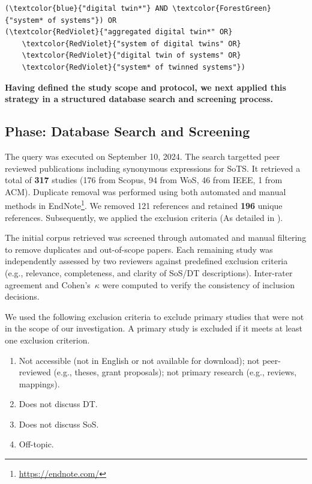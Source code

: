 \begin{footnotesize}
\begin{Verbatim}[commandchars=\\\{\}]
(\textcolor{blue}{"digital twin*"} AND \textcolor{ForestGreen}{"system* of systems"}) OR
(\textcolor{RedViolet}{"aggregated digital twin*" OR}
    \textcolor{RedViolet}{"system of digital twins" OR}
    \textcolor{RedViolet}{"digital twin of systems" OR}
    \textcolor{RedViolet}{"system* of twinned systems"})
\end{Verbatim}
\end{footnotesize}

\textbf{Having defined the study scope and protocol, we next applied this strategy in a structured database search and screening process.}


\subsection{Phase: Database Search and Screening}\label{subsec:literature-review-study-phases-screening}

The query was executed on September 10, 2024. The search targetted peer reviewed publications including synonymous expressions for SoTS. It retrieved a total of \textbf{317} studies (176 from Scopus, 94 from WoS, 46 from IEEE, 1 from ACM). Duplicate removal was performed using both automated and manual methods in EndNote\footnote{\url{https://endnote.com/}}. We removed 121 references and retained \textbf{196} unique references. Subsequently, we applied the exclusion criteria (As detailed in ).

The initial corpus retrieved was screened through automated and manual filtering to remove duplicates and out-of-scope papers. Each remaining study was independently assessed by two reviewers against predefined exclusion criteria (e.g., relevance, completeness, and clarity of SoS/DT descriptions). Inter-rater agreement and Cohen’s~\(\kappa\) were computed to verify the consistency of inclusion decisions.

We used the following exclusion criteria to exclude primary studies that were not in the scope of our investigation. A primary study is excluded if it meets at least one exclusion criterion.

\begin{enumerate}[\bfseries{E}1.]
\itemsep0em
\setcounter{enumi}{-1}
    \item Not accessible (not in English or not available for download); not peer-reviewed (e.g., theses, grant proposals); not primary research (e.g., reviews, mappings).
    \item Does not discuss DT.
    \item Does not discuss SoS.
    \item Off-topic.
\end{enumerate}

